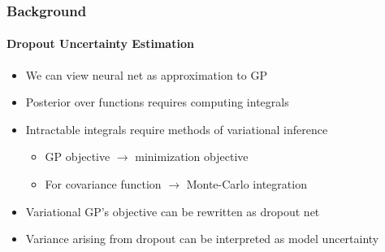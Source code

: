 \documentclass[9pt]{beamer}
\begin{document}
\begin{frame}
\frametitle{Background}
\framesubtitle{Dropout Uncertainty Estimation}
\begin{itemize}
	\item We can view neural net as approximation to GP
	\item Posterior over functions requires computing integrals
	\item Intractable integrals require methods of variational inference
	\begin{itemize}
		\item GP objective $\rightarrow$ minimization objective
		\item For covariance function $\rightarrow$ Monte-Carlo integration
	\end{itemize}
	\item Variational GP's objective can be rewritten as dropout net
	\item Variance arising from dropout can be interpreted as model uncertainty
\end{itemize}
\end{frame}
\end{document}
